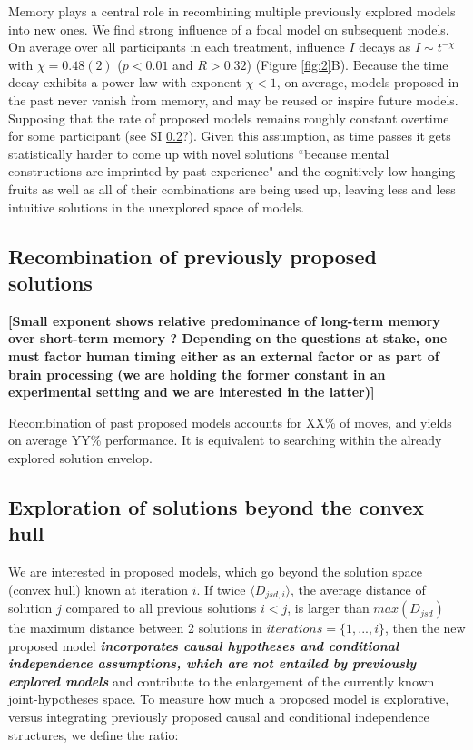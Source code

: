 Memory plays a central role in recombining multiple previously explored models into new ones. We find strong influence of a focal model on subsequent models. On average over all participants in each treatment, influence $I$ decays as $I \sim t^{-\chi}$ with $\chi = 0.48(2)$ ($p < 0.01$ and $R > 0.32$)  (Figure \ref{fig:2}B). Because the time decay exhibits a power law with exponent $\chi < 1$, on average, models proposed in the past never vanish from memory, and may be reused or inspire future models. Supposing that the rate of proposed models remains roughly constant  overtime for some participant (see SI \ref{}?). Given this assumption, as time passes it gets statistically harder to come up with novel solutions ``because mental constructions are imprinted by past experience" and the cognitively low hanging fruits as well as all of their combinations are being used up, leaving less and less intuitive solutions in the unexplored space of models. 


\subsection{Recombination of previously proposed solutions}

{\bf [Small exponent shows relative predominance of long-term memory over short-term memory ? Depending on the questions at stake, one must factor human timing either as an external factor or as part of brain processing (we are holding the former constant in an experimental setting and we are interested in the latter)]}

Recombination of past proposed models accounts for XX\% of moves, and yields on average  YY\% performance. It is equivalent to searching within the already explored solution envelop.


\subsection{Exploration of solutions beyond the convex hull}
We are interested in proposed models, which go beyond the solution space (convex hull) known at iteration $i$. If twice $\langle D_{jsd,i} \rangle$, the average distance of solution $j$ compared to all previous solutions $i < j$, is larger than $ max(D_{jsd})$ the maximum distance between 2 solutions in $iterations = \{1,...,i\}$, then the new proposed model {\it {\bf incorporates causal hypotheses and conditional independence assumptions, which are not entailed by previously explored models}} and contribute to the enlargement of the currently known joint-hypotheses space. To measure how much a proposed model is explorative, versus integrating previously proposed causal and conditional independence structures, we define the ratio:

